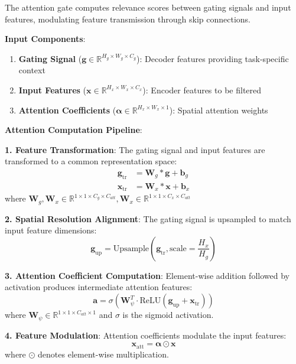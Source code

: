 \documentclass[12pt,a4paper]{article}
\begin{document}
The attention gate computes relevance scores between gating signals and input features, modulating feature transmission through skip connections.

\textbf{Input Components}:
\begin{enumerate}
    \item \textbf{Gating Signal} ($\mathbf{g} \in \mathbb{R}^{H_g \times W_g \times C_g}$): Decoder features providing task-specific context
    \item \textbf{Input Features} ($\mathbf{x} \in \mathbb{R}^{H_x \times W_x \times C_x}$): Encoder features to be filtered
    \item \textbf{Attention Coefficients} ($\mathbf{\alpha} \in \mathbb{R}^{H_x \times W_x \times 1}$): Spatial attention weights
\end{enumerate}

\textbf{Attention Computation Pipeline}:

\textbf{1. Feature Transformation}:
The gating signal and input features are transformed to a common representation space:
\begin{align}
\mathbf{g}_{\text{tr}} &= \mathbf{W}_g \ast \mathbf{g} + \mathbf{b}_g \\
\mathbf{x}_{\text{tr}} &= \mathbf{W}_x \ast \mathbf{x} + \mathbf{b}_x
\end{align}
where $\mathbf{W}_g, \mathbf{W}_x \in \mathbb{R}^{1 \times 1 \times C_g \times C_{att}}, \mathbf{W}_x \in \mathbb{R}^{1 \times 1 \times C_x \times C_{att}}$

\textbf{2. Spatial Resolution Alignment}:
The gating signal is upsampled to match input feature dimensions:
\begin{equation}
\mathbf{g}_{\text{up}} = \text{Upsample}(\mathbf{g}_{\text{tr}}, \text{scale}=\frac{H_x}{H_g})
\end{equation}

\textbf{3. Attention Coefficient Computation}:
Element-wise addition followed by activation produces intermediate attention features:
\begin{equation}
\mathbf{a} = \sigma(\mathbf{W}_\psi^T \cdot \text{ReLU}(\mathbf{g}_{\text{up}} + \mathbf{x}_{\text{tr}}))
\end{equation}
where $\mathbf{W}_\psi \in \mathbb{R}^{1 \times 1 \times C_{att} \times 1}$ and $\sigma$ is the sigmoid activation.

\textbf{4. Feature Modulation}:
Attention coefficients modulate the input features:
\begin{equation}
\mathbf{x}_{\text{att}} = \mathbf{\alpha} \odot \mathbf{x}
\end{equation}
where $\odot$ denotes element-wise multiplication.
\end{document}
